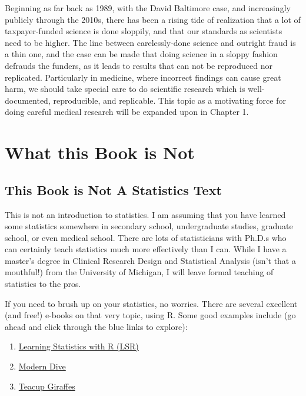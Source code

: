 \documentclass[]{book}
\providecommand{\tightlist}{%
  \setlength{\itemsep}{0pt}\setlength{\parskip}{0pt}}
\begin{document}
Beginning as far back as 1989, with the David Baltimore case, and increasingly publicly through the 2010s, there has been a rising tide of realization that a lot of taxpayer-funded science is done sloppily, and that our standards as scientists need to be higher. The line between carelessly-done science and outright fraud is a thin one, and the case can be made that doing science in a sloppy fashion defrauds the funders, as it leads to results that can not be reproduced nor replicated. Particularly in medicine, where incorrect findings can cause great harm, we should take special care to do scientific research which is well-documented, reproducible, and replicable. This topic as a motivating force for doing careful medical research will be expanded upon in Chapter 1.

\hypertarget{what-this-book-is-not}{%
\section{What this Book is Not}\label{what-this-book-is-not}}

\hypertarget{this-book-is-not-a-statistics-text}{%
\subsection{This Book is Not A Statistics Text}\label{this-book-is-not-a-statistics-text}}

This is not an introduction to statistics. I am assuming that you have learned some statistics somewhere in secondary school, undergraduate studies, graduate school, or even medical school. There are lots of statisticians with Ph.D.s who can certainly teach statistics much more effectively than I can. While I have a master's degree in Clinical Research Design and Statistical Analysis (isn't that a mouthful!) from the University of Michigan, I will leave formal teaching of statistics to the pros.

If you need to brush up on your statistics, no worries. There are several excellent (and free!) e-books on that very topic, using R. Some good examples include (go ahead and click through the blue links to explore):

\begin{enumerate}
\def\labelenumi{\arabic{enumi}.}
\tightlist
\item
  \href{https://learningstatisticswithr-bookdown.netlify.com}{Learning Statistics with R (LSR)}
\item
  \href{https://bookdown.org/fjmcgrade/ismaykim/}{Modern Dive}
\item
  \href{https://tinystats.github.io/teacups-giraffes-and-statistics/index.html}{Teacup Giraffes}
\end{enumerate}
\end{document}
